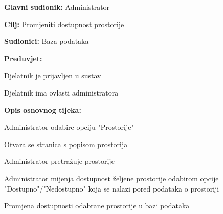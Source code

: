 				\noindent {}
				\begin{packed_item}
					
					\item \textbf{Glavni sudionik: }Administrator
					\item  \textbf{Cilj: }Promjeniti dostupnost prostorije
					\item  \textbf{Sudionici: }Baza podataka
					\item  \textbf{Preduvjet: }
					\item[] \begin{packed_enum}
						
						\item[-] Djelatnik je prijavljen u sustav
						\item[-] Djelatnik ima ovlasti administratora
					\end{packed_enum}
					\item  \textbf{Opis osnovnog tijeka: }
					
					\item[] \begin{packed_enum}
						\item Administrator odabire opciju "Prostorije"
						\item Otvara se stranica s popisom prostorija
						\item Administrator pretražuje prostorije
						\item Administrator mijenja dostupnost željene prostorije odabirom opcije "Dostupno"/"Nedostupno" koja se nalazi pored podataka o prostoriji
						\item Promjena dostupnosti odabrane prostorije u bazi podataka
					\end{packed_enum}
					
				\end{packed_item}
				
